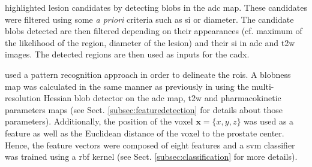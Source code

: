 \cite{Vos2012} highlighted lesion candidates by detecting blobs in the \ac{adc} map. These candidates were filtered using some \textit{a priori} criteria such as \ac{si} or diameter. %
%
%
%
The candidate blobs detected are then filtered depending on their appearances (cf. maximum of the likelihood of the region, diameter of the lesion) and their \ac{si} in \ac{adc} and \ac{t2w} images. The detected regions are then used as inputs for the \ac{cadx}.

\cite{Litjens2011} used a pattern recognition approach in order to delineate the \acp{roi}. A blobness map was calculated in the same manner as previously in \cite{Vos2010} using the multi-resolution Hessian blob detector on the \ac{adc} map, \ac{t2w} and pharmacokinetic parameters maps (see Sect. \ref{subsec:featuredetection} for details about those parameters). Additionally, the position of the voxel $\mathbf{x}=\{x,y,z\}$ was used as a feature as well as the Euclidean distance of the voxel to the prostate center. Hence, the feature vectors were composed of eight features and a \ac{svm} classifier was trained using a \ac{rbf} kernel (see Sect. \ref{subsec:classification} for more details).

